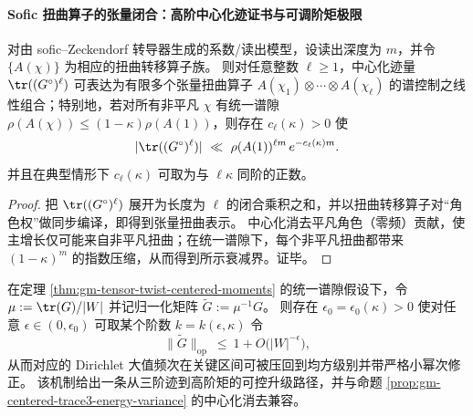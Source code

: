 \paragraph{Sofic 扭曲算子的张量闭合：高阶中心化迹证书与可调阶矩极限}
\begin{theorem}\label{thm:gm-tensor-twist-centered-moments}
对由 sofic--Zeckendorf 转导器生成的系数/读出模型，设读出深度为 \(m\)，并令 \(\{A(\chi)\}\) 为相应的扭曲转移算子族。
则对任意整数 \(\ell\ge 1\)，中心化迹量 \(\tr((G^\circ)^\ell)\) 可表达为有限多个张量扭曲算子
\(
A(\chi_1)\otimes\cdots\otimes A(\chi_\ell)
\)
的谱控制之线性组合；特别地，若对所有非平凡 \(\chi\) 有统一谱隙
\(
\rho(A(\chi))\le (1-\kappa)\rho(A(1))
\)，则存在 \(c_\ell(\kappa)>0\) 使
\[
|\tr((G^\circ)^\ell)|\ \ll\ \rho(A(1))^{\ell m}\,e^{-c_\ell(\kappa)m}.
\]
并且在典型情形下 \(c_\ell(\kappa)\) 可取为与 \(\ell\kappa\) 同阶的正数。
\end{theorem}

\begin{proof}
把 \(\tr((G^\circ)^\ell)\) 展开为长度为 \(\ell\) 的闭合乘积之和，并以扭曲转移算子对“角色权”做同步编译，即得到张量扭曲表示。
中心化消去平凡角色（零频）贡献，使主增长仅可能来自非平凡扭曲；在统一谱隙下，每个非平凡扭曲都带来 \((1-\kappa)^m\) 的指数压缩，从而得到所示衰减界。证毕。
\end{proof}

\begin{corollary}\label{cor:gm-adjustable-moment-mean-square}
在定理 \ref{thm:gm-tensor-twist-centered-moments} 的统一谱隙假设下，令 \(\mu:=\tr(G)/|W|\) 并记归一化矩阵 \(\widetilde G:=\mu^{-1}G\)。
则存在 \(\epsilon_0=\epsilon_0(\kappa)>0\) 使对任意 \(\epsilon\in(0,\epsilon_0)\) 可取某个阶数 \(k=k(\epsilon,\kappa)\) 令
\[
\|\widetilde G\|_{\mathrm{op}}
\ \le\
1+O\!\bigl(|W|^{-\epsilon}\bigr),
\]
从而对应的 Dirichlet 大值频次在关键区间可被压回到均方级别并带严格小幂次修正。
该机制给出一条从三阶迹到高阶矩的可控升级路径，并与命题 \ref{prop:gm-centered-trace3-energy-variance} 的中心化消去兼容。
\end{corollary}

